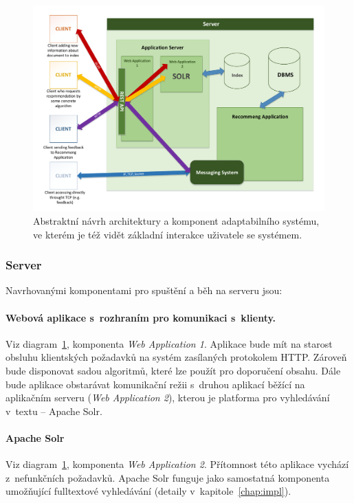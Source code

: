 \documentclass[thesis=M,czech]{FITthesis}[2014/05/07]
\begin{document}
\begin{figure}\centering
	\includegraphics[width=1.0\textwidth]{obr/DIPLOMKA_env.pdf}
 	\caption[Abstraktní návrh architektury a komponent adaptabilního systému]{Abstraktní návrh architektury a komponent adaptabilního systému, ve kterém je též vidět základní interakce uživatele se systémem.}\label{fig:recommeng}
\end{figure}	

\subsubsection{Server}
Navrhovanými komponentami pro spuštění a běh na serveru jsou:

\paragraph{Webová aplikace s~rozhraním pro komunikaci s~klienty.}
	Viz diagram~\ref{fig:recommeng}, komponenta \emph{Web Application 1}. Aplikace bude mít na starost obsluhu klientských požadavků na systém zasílaných protokolem HTTP. Zároveň bude disponovat sadou algoritmů, které lze použít pro doporučení obsahu. Dále bude aplikace obstarávat komunikační režii s~druhou aplikací běžící na aplikačním serveru (\emph{Web Application 2}), kterou je platforma pro vyhledávání v~textu – Apache Solr.

\paragraph{Apache Solr}
	Viz diagram~\ref{fig:recommeng}, komponenta \emph{Web Application 2}. Přítomnost této aplikace vychází z~nefunkčních požadavků. Apache Solr funguje jako samostatná komponenta umožňující fulltextové vyhledávání (detaily v~kapitole~\ref{chap:impl}).
\end{document}
